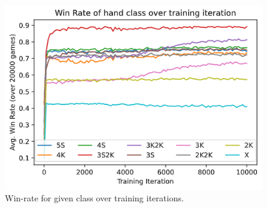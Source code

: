\documentclass[../main.tex]{subfiles}
\begin{document}
\begin{figure}
    \centering
    \includegraphics[width=\textwidth,keepaspectratio]{images/results/handclassovertime.png}
    \caption{Win-rate for given class over training iterations.}
    \label{fig:handclass-overtime}
\end{figure}
\end{document}
